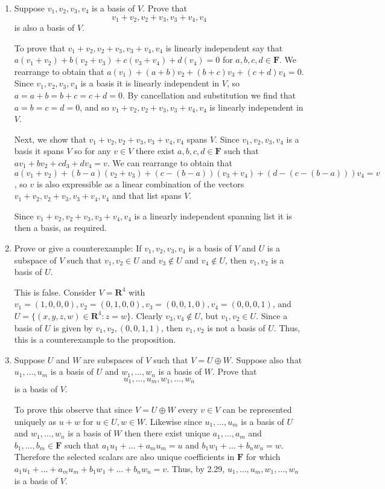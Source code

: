 \documentclass{book}
\begin{document}
\begin{enumerate}
\item Suppose \(v_1,v_2,v_3,v_4\) is a basis of \(V\).  Prove that \[v_1+v_2,v_2+v_3,v_3+v_4,v_4\] is also a basis of \(V\).

To prove that \(v_1+v_2,v_2+v_3,v_3+v_4,v_4\) is linearly independent say that \(a(v_1+v_2)+b(v_2+v_3)+c(v_3+v_4)+d(v_4)=0\) for \(a,b,c,d \in \textbf{F}\).  We rearrange to obtain that \(a(v_1)+(a+b)v_2+(b+c)v_3+(c+d)v_4=0\).  Since \(v_1,v_2,v_3,v_4\) is a basis it is linearly independent in \(V\), so \(a=a+b=b+c=c+d=0\).  By cancellation and substitution we find that \(a=b=c=d=0\), and so \(v_1+v_2,v_2+v_3,v_3+v_4,v_4\) is linearly independent in \(V\).

Next, we show that \(v_1+v_2,v_2+v_3,v_3+v_4,v_4\) spans \(V\).  Since \(v_1,v_2,v_3,v_4\) is a basis it spans \(V\) so for any \(v \in V\) there exist \(a,b,c,d \in \textbf{F}\) such that \(av_1+bv_2+cd_3+dv_4=v\).  We can rearrange to obtain that \(a(v_1+v_2)+(b-a)(v_2+v_3)+(c-(b-a))(v_3+v_4)+(d-(c-(b-a)))v_4=v\), so \(v\) is also expressible as a linear combination of the vectors \(v_1+v_2,v_2+v_3,v_3+v_4,v_4\) and that list spans \(V\).

Since \(v_1+v_2,v_2+v_3,v_3+v_4,v_4\) is a linearly independent spanning list it is then a basis, as required.

\item Prove or give a counterexample: If \(v_1,v_2,v_3,v_4\) is a basis of \(V\) and \(U\) is a subspace of \(V\) such that \(v_1,v_2 \in U\) and \(v_3 \notin U\) and \(v_4 \notin U\), then \(v_1,v_2\) is a basis of \(U\).

This is false.  Consider \(V=\textbf{R}^4\) with \(v_1=(1,0,0,0),v_2=(0,1,0,0),v_3=(0,0,1,0),v_4=(0,0,0,1)\), and \(U=\{(x,y,z,w) \in \textbf{R}^4:z=w\}\).  Clearly \(v_3,v_4 \notin U\), but \(v_1,v_2 \in U\).  Since a basis of \(U\) is given by \(v_1,v_2,(0,0,1,1)\), then \(v_1,v_2\) is not a basis of \(U\).  Thus, this is a counterexample to the proposition.

\item Suppose \(U\) and \(W\) are subspaces of \(V\) such that \(V=U \oplus W\).  Suppose also that \(u_1,\dots,u_m\) is a basis of \(U\) and \(w_1,\dots,w_n\) is a basis of \(W\).  Prove that \[u_1,\dots,u_m,w_1,\dots,w_n\] is a basis of \(V\).

To prove this observe that since \(V=U \oplus W\) every \(v \in V\) can be represented uniquely as \(u+w\) for \(u \in U,w \in W\).  Likewise since \(u_1,\dots,u_m\) is a basis of \(U\) and \(w_1,\dots,w_n\) is a basis of \(W\) then there exist unique \(a_1,\dots,a_m\) and \(b_1,\dots,b_m \in \textbf{F}\) such that \(a_1u_1+\dots+a_mu_m=u\) and \(b_1w_1+\dots+b_nw_n=w\).  Therefore the selected scalars are also unique coefficients in \(\textbf{F}\) for which \(a_1u_1 +\dots+a_mu_m+b_1w_1+\dots+b_nw_n=v\).  Thus, by 2.29, \(u_1,\dots,u_m,w_1,\dots,w_n\) is a basis of \(V\).

\end{enumerate}
\end{document}
